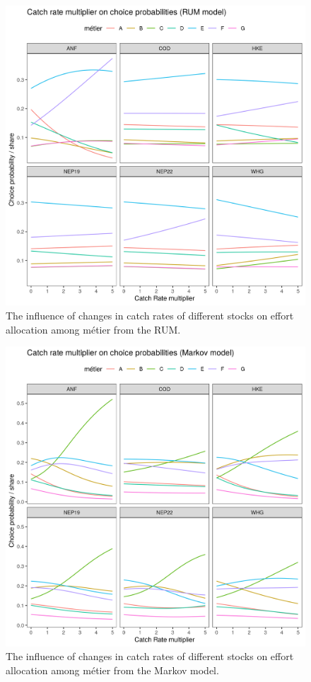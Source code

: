 \documentclass[12pt, halfline, a4paper]{ouparticle}
\begin{document}
\begin{figure}[!ht]
	\centering
	\includegraphics[width=1\linewidth]{figures/RUM_Metier_Catch_Rate_Multiplier}
	\caption{The influence of changes in catch rates of different stocks on
	effort allocation among métier from the RUM.} 
	\label{fig:RUM_CR}
\end{figure}	

\begin{figure}[!ht]
	\centering
	\includegraphics[width=1\linewidth]{figures/Markov_Metier_Catch_Rate_Multiplier}
	\caption{The influence of changes in catch rates of different stocks on
	effort allocation among métier from the Markov model.} 
	\label{fig:Markov_CR}
\end{figure}	
\end{document}
